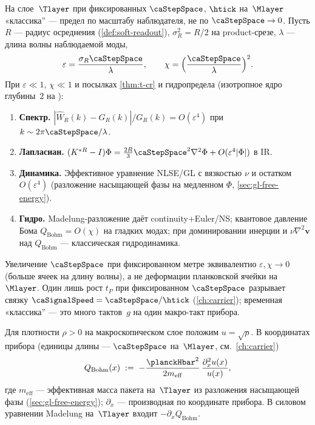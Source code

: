 \begin{theorem}[T-CL]
\label{thm:t-cl}
На слое~$\Tlayer$ при фиксированных $\caStepSpace$, $\htick$ на~$\Mlayer$
«классика'' --- предел по масштабу наблюдателя, не по $\caStepSpace\to 0$.
Пусть $R$ --- радиус осреднения (\cref{def:soft-readout}),
$\sigma_R^2=R/2$ на product-срезе,
$\lambda$ --- длина волны наблюдаемой моды,
\[
  \varepsilon=\frac{\sigma_R\caStepSpace}{\lambda},\qquad
  \chi=\Bigl(\frac{\caStepSpace}{\lambda}\Bigr)^2.
\]
При $\varepsilon\ll 1$, $\chi\ll 1$ и посылках \cref{thm:t-cr} и гидропредела
(изотропное ядро глубины~$2$ на \latGCKshort):
\begin{enumerate}[label=(\roman*)]
\item \textbf{Спектр.} $|\widehat W_R(k)-G_R(k)|/G_R(k)=O(\varepsilon^4)$ при $k\sim 2\pi\caStepSpace/\lambda$.
\item \textbf{Лапласиан.} $(K^{*R}-I)\Phi=\tfrac{2R}{3}\caStepSpace^2\nabla^2\Phi+O(\varepsilon^4|\Phi|)$ в IR.
\item \textbf{Динамика.} Эффективное уравнение NLSE/GL с вязкостью $\nu$ и остатком $O(\varepsilon^4)$
  (разложение насыщающей фазы на медленном $\Phi$, \cref{sec:gl-free-energy}).
\item \textbf{Гидро.} Madelung-разложение даёт continuity+Euler/NS;
  квантовое давление Бома $Q_{\mathrm{Bohm}}=O(\chi)$ на гладких модах;
  при доминировании инерции и $\nu\nabla^2\mathbf v$ над $Q_{\mathrm{Bohm}}$ ---
  классическая гидродинамика.
\end{enumerate}
\end{theorem}

\begin{remark}
Увеличение $\caStepSpace$ при фиксированном метре эквивалентно $\varepsilon,\chi\to 0$
(больше ячеек на длину волны), а не деформации планковской ячейки на~$\Mlayer$.
Один лишь рост $t_P$ при фиксированном $\caStepSpace$ разрывает связку $\caSignalSpeed=\caStepSpace/\htick$
(\cref{ch:carrier}); временная «классика'' --- это много тактов~$g$ на один макро-такт прибора.
\end{remark}

\begin{definition}
\label{def:bohm-pressure}
Для плотности $\rho>0$ на макроскопическом слое положим $u=\sqrt{\rho}$.
В координатах прибора (единицы длины --- $\caStepSpace$ на~$\Mlayer$, см.~\cref{ch:carrier})
\[
  Q_{\mathrm{Bohm}}(x)\;:=\;-\frac{\planckHbar^2}{2m_{\mathrm{eff}}}\,
  \frac{\partial_x^2 u(x)}{u(x)},
\]
где $m_{\mathrm{eff}}$ --- эффективная масса пакета на~$\Tlayer$ из разложения насыщающей фазы
(\cref{sec:gl-free-energy}); $\partial_x$ --- производная по координате прибора.
В силовом уравнении Madelung на~$\Tlayer$ входит $-\partial_x Q_{\mathrm{Bohm}}$.
\end{definition}

